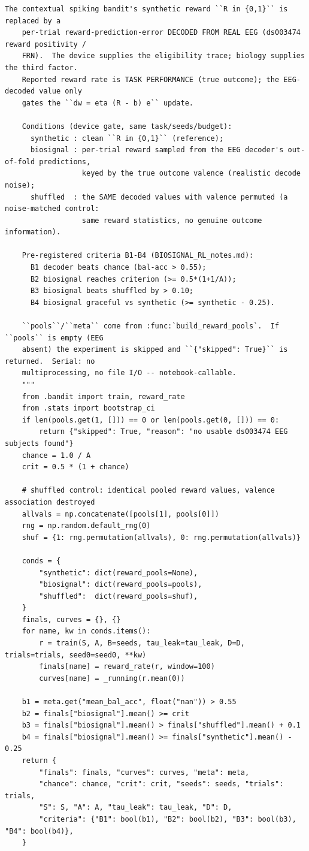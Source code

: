 \begin{lstlisting}[caption={mrl\_trace/biosignal.py},label={lst:siox-src-biosignal}]
    The contextual spiking bandit's synthetic reward ``R in {0,1}`` is replaced by a
    per-trial reward-prediction-error DECODED FROM REAL EEG (ds003474 reward positivity /
    FRN).  The device supplies the eligibility trace; biology supplies the third factor.
    Reported reward rate is TASK PERFORMANCE (true outcome); the EEG-decoded value only
    gates the ``dw = eta (R - b) e`` update.

    Conditions (device gate, same task/seeds/budget):
      synthetic : clean ``R in {0,1}`` (reference);
      biosignal : per-trial reward sampled from the EEG decoder's out-of-fold predictions,
                  keyed by the true outcome valence (realistic decode noise);
      shuffled  : the SAME decoded values with valence permuted (a noise-matched control:
                  same reward statistics, no genuine outcome information).

    Pre-registered criteria B1-B4 (BIOSIGNAL_RL_notes.md):
      B1 decoder beats chance (bal-acc > 0.55);
      B2 biosignal reaches criterion (>= 0.5*(1+1/A));
      B3 biosignal beats shuffled by > 0.10;
      B4 biosignal graceful vs synthetic (>= synthetic - 0.25).

    ``pools``/``meta`` come from :func:`build_reward_pools`.  If ``pools`` is empty (EEG
    absent) the experiment is skipped and ``{"skipped": True}`` is returned.  Serial: no
    multiprocessing, no file I/O -- notebook-callable.
    """
    from .bandit import train, reward_rate
    from .stats import bootstrap_ci
    if len(pools.get(1, [])) == 0 or len(pools.get(0, [])) == 0:
        return {"skipped": True, "reason": "no usable ds003474 EEG subjects found"}
    chance = 1.0 / A
    crit = 0.5 * (1 + chance)

    # shuffled control: identical pooled reward values, valence association destroyed
    allvals = np.concatenate([pools[1], pools[0]])
    rng = np.random.default_rng(0)
    shuf = {1: rng.permutation(allvals), 0: rng.permutation(allvals)}

    conds = {
        "synthetic": dict(reward_pools=None),
        "biosignal": dict(reward_pools=pools),
        "shuffled":  dict(reward_pools=shuf),
    }
    finals, curves = {}, {}
    for name, kw in conds.items():
        r = train(S, A, B=seeds, tau_leak=tau_leak, D=D, trials=trials, seed0=seed0, **kw)
        finals[name] = reward_rate(r, window=100)
        curves[name] = _running(r.mean(0))

    b1 = meta.get("mean_bal_acc", float("nan")) > 0.55
    b2 = finals["biosignal"].mean() >= crit
    b3 = finals["biosignal"].mean() > finals["shuffled"].mean() + 0.1
    b4 = finals["biosignal"].mean() >= finals["synthetic"].mean() - 0.25
    return {
        "finals": finals, "curves": curves, "meta": meta,
        "chance": chance, "crit": crit, "seeds": seeds, "trials": trials,
        "S": S, "A": A, "tau_leak": tau_leak, "D": D,
        "criteria": {"B1": bool(b1), "B2": bool(b2), "B3": bool(b3), "B4": bool(b4)},
    }



\end{lstlisting}
